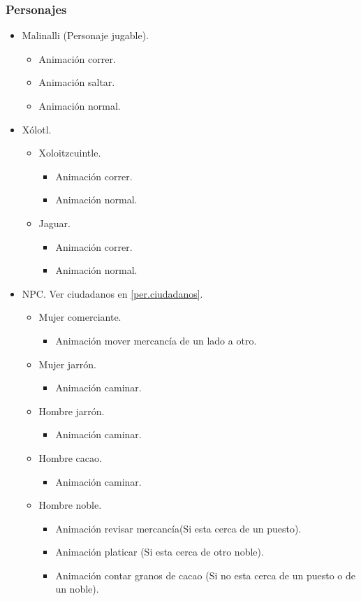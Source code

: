 \documentclass[11pt,letterpaper]{article}
\begin{document}
	\subsubsection{Personajes}
\begin{itemize}
\item Malinalli (Personaje jugable).
	\begin{itemize}
		\item Animación correr.
		\item Animación saltar. 
		\item Animación normal. 
	\end{itemize}	
\item Xólotl.
	\begin{itemize}
		\item Xoloitzcuintle.
			\begin{itemize}
				\item Animación correr.
				\item Animación normal. 
		\end{itemize}	
		\item Jaguar.
			\begin{itemize}
				\item Animación correr.
				\item Animación normal. 
		\end{itemize}	
	\end{itemize}	

\item NPC. Ver ciudadanos en \ref{per.ciudadanos}.
	\begin{itemize}
		\item Mujer comerciante. 
			\begin{itemize}
				\item Animación mover mercancía de un lado a otro.
			\end{itemize}
		\item Mujer jarrón.
			\begin{itemize}
				\item Animación caminar.
			\end{itemize}			 
		\item Hombre jarrón.
			\begin{itemize}
				\item Animación caminar.
			\end{itemize} 
		\item Hombre cacao.
			\begin{itemize}
				\item Animación caminar.
			\end{itemize}
		\item Hombre noble.
			\begin{itemize}
				\item Animación revisar mercancía(Si esta cerca de un puesto). 
				\item Animación platicar (Si esta cerca de otro noble).
				\item Animación contar granos de cacao (Si no esta cerca de un puesto o de un noble).
			\end{itemize}				
	\end{itemize}	 
\end{itemize}
\end{document}
